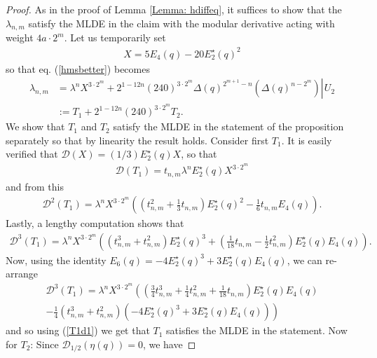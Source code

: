 \documentclass[10pt,a4paper]{amsart}
\newcommand{\haupt}{\lambda}
\newcommand{\utwo}[1]{\left. #1 \right\rvert \hspace{1pt} U_{2}}
\begin{document}
\begin{proof}
    As in the proof of Lemma \ref{Lemma: hdiffeq}, it suffices to show that the $\haupt_{n,m}$ satisfy the MLDE in the claim with the modular derivative acting with weight $4a \cdot 2^{m}$. Let us temporarily set
   \begin{align*}
       X = 5E_{4}(q) - 20 E_{2}^{\star}(q)^{2}
   \end{align*}
   so that eq. (\ref{hmsbetter}) becomes
   \begin{align*}
        \haupt_{n,m} &= \haupt^{n}  X^{3 \cdot 2^{m}} + 2^{1 - 12n} (240)^{3 \cdot 2^{m}} \Delta (q)^{2^{m+1}-n} \utwo{ \left( \Delta (q)^{n-2^{m}} \right) } \\
        &:= T_{1} + 2^{1-12n} (240)^{3 \cdot 2^{m}}  T_{2}.
   \end{align*}
   We show that $T_{1}$ and $T_{2}$ satisfy the MLDE in the statement of the proposition separately so that by linearity the result holds. Consider first $T_{1}$. It is easily verified that $\mathcal{D}(X) = (1/3)E_{2}^{\star}(q)X$, so that
   \begin{align}
       \mathcal{D}(T_{1}) = t_{n,m} \haupt^{n} E_{2}^{\star}(q) X^{3 \cdot 2^{m}} \label{T1d1}
   \end{align}
   and from this
   \begin{align*}
       \mathcal{D}^{2}(T_{1}) = \haupt^{n} X^{3 \cdot 2^{m}} \left( \left( t_{n,m}^{2} + \frac{1}{3} t_{n,m} \right) E_{2}^{\star}(q)^{2} - \frac{1}{6} t_{n,m} E_{4}(q) \right).
   \end{align*}
   Lastly, a lengthy computation shows that
   \begin{align*}
       \mathcal{D}^{3}(T_{1}) = \haupt^{n}X^{3 \cdot 2^{m}} \left( \left( t_{n,m}^{3} + t_{n,m}^{2} \right) E_{2}^{\star}(q)^{3} + \left( \frac{1}{18} t_{n,m} - \frac{1}{2} t_{n,m}^{2} \right) E_{2}^{\star}(q)E_{4}(q) \right).
   \end{align*}
   Now, using the identity $E_{6}(q) = -4 E_{2}^{\star}(q)^{3} + 3 E_{2}^{\star}(q) E_{4}(q)$, we can re-arrange
   \begin{multline*}
       \mathcal{D}^{3}(T_{1}) = \haupt^{n} X^{3 \cdot 2^{m}} \left( \left( \frac{3}{4} t_{n,m}^{3} + \frac{1}{4} t_{n,m}^{2} + \frac{1}{18} t_{n,m} \right) E_{2}^{\star}(q)E_{4}(q) \right. \\ \left. - \frac{1}{4}\left( t_{n,m}^{3} + t_{n,m}^{2} \right) \left( -4 E_{2}^{\star}(q)^{3} + 3 E_{2}^{\star}(q)E_{4}(q) \right) \right)
   \end{multline*}
   and so using (\ref{T1d1}) we get that $T_{1}$ satisfies the MLDE in the statement. Now for $T_{2}$: Since $\mathcal{D}_{1/2}(\eta(q)) = 0$, we have

\end{proof}
\end{document}
